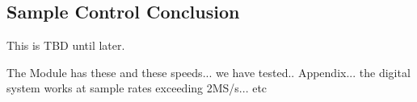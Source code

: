 \subsection{Sample Control Conclusion} \label{subsec:SampleControlConclusion} 

This is TBD until later.

The Module has these and these speeds... we have tested.. Appendix... the digital system works at sample rates exceeding 2MS/s... etc